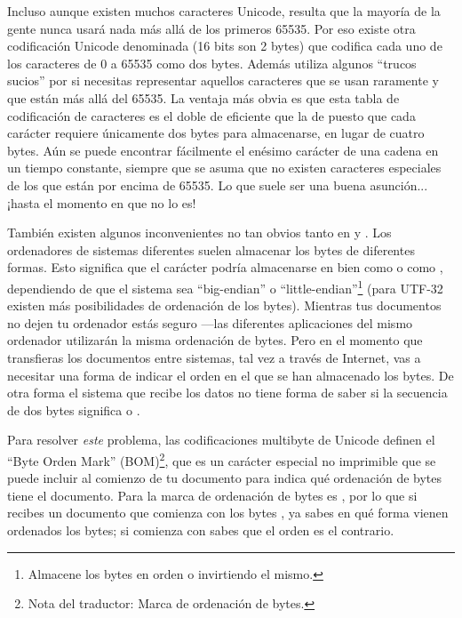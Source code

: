 Incluso aunque existen muchos caracteres Unicode, resulta que la mayoría de la gente nunca usará nada más allá de los primeros 65535. Por eso existe otra codificación Unicode denominada  (16 bits son 2 bytes) que codifica cada uno de los caracteres de 0 a 65535 como dos bytes. Además utiliza algunos ``trucos sucios'' por si necesitas representar aquellos caracteres que se usan raramente y que están más allá del 65535. La ventaja más obvia es que esta tabla de codificación de caracteres es el doble de eficiente que la de  puesto que cada carácter requiere únicamente dos bytes para almacenarse, en lugar de cuatro bytes. Aún se puede encontrar fácilmente el enésimo carácter de una cadena en un tiempo constante, siempre que se asuma que no existen caracteres especiales de los que están por encima de 65535. Lo que suele ser una buena asunción... ¡hasta el momento en que no lo es!

También existen algunos inconvenientes no tan obvios tanto en  y . Los ordenadores de sistemas diferentes suelen almacenar los bytes de diferentes formas. Esto significa que el carácter  podría almacenarse en  bien como  o como , dependiendo de que el sistema sea ``big-endian'' o ``little-endian''\footnote{Almacene los bytes en orden o invirtiendo el mismo.} (para UTF-32 existen más posibilidades de ordenación de los bytes). Mientras tus documentos no dejen tu ordenador estás seguro ---las diferentes aplicaciones del mismo ordenador utilizarán la misma ordenación de bytes. Pero en el momento que transfieras los documentos entre sistemas, tal vez a través de Internet, vas a necesitar una forma de indicar el orden en el que se han almacenado los bytes. De otra forma el sistema que recibe los datos no tiene forma de saber si la secuencia de dos bytes  significa  o .

Para resolver \emph{este} problema, las codificaciones multibyte de Unicode definen el ``Byte Orden Mark'' (BOM)\footnote{Nota del traductor: Marca de ordenación de bytes.}, que es un carácter especial no imprimible que se puede incluir al comienzo de tu documento para indica qué ordenación de bytes tiene el documento. Para  la marca de ordenación de bytes es , por lo que si recibes un documento  que comienza con los bytes , ya sabes en qué forma vienen ordenados los bytes; si comienza con  sabes que el orden es el contrario.


